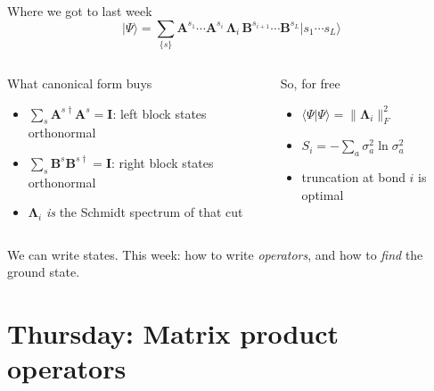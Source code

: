 \documentclass[aspectratio=169,10pt]{beamer}
\newcommand{\ket}[1]{\vert #1\rangle}
\newcommand{\braket}[2]{\langle #1\vert #2\rangle}
\newcommand{\bmat}[1]{\bm{#1}}
\newcommand{\Amat}[1]{\bm{A}^{#1}}
\newcommand{\Bmat}[1]{\bm{B}^{#1}}
\begin{document}
\begin{frame}{Where we got to last week}
  \[
    \ket\Psi=\sum_{\{s\}}\Amat{s_1}\cdots\Amat{s_{i}}\,\bm\Lambda_i\,\Bmat{s_{i+1}}\cdots\Bmat{s_L}\ket{s_1\cdots s_L}
  \]
  \begin{columns}[T]
    \begin{block}{What canonical form buys}
      \begin{itemize}
        \item $\sum_s\Amat{s\dagger}\Amat s=\bmat I$: left block states orthonormal
        \item $\sum_s\Bmat s\Bmat{s\dagger}=\bmat I$: right block states orthonormal
        \item $\bm\Lambda_i$ \emph{is} the Schmidt spectrum of that cut
      \end{itemize}
    \end{block}
    \begin{block}{So, for free}
      \begin{itemize}
        \item $\braket\Psi\Psi=\|\bm\Lambda_i\|_F^2$
        \item $S_i=-\sum_a\sigma_a^2\ln\sigma_a^2$
        \item truncation at bond $i$ is optimal
      \end{itemize}
    \end{block}
  \end{columns}
  \vspace{0.6em}
  \centering We can \alert{write} states. This week: how to write \emph{operators}, and how to \emph{find} the ground state.
\end{frame}

\section{Thursday: Matrix product operators}
\end{document}
